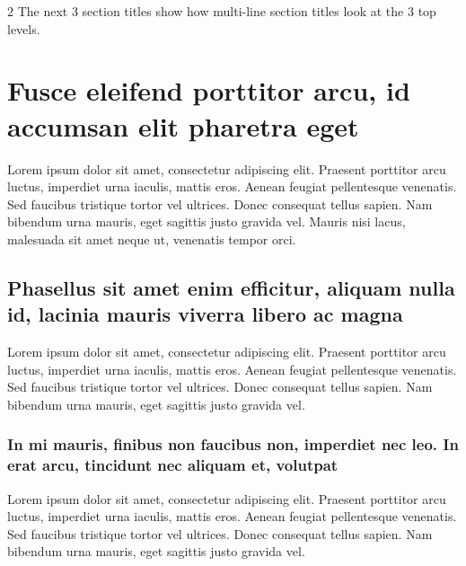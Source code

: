 \documentclass[
	a4paper, %
]{CSMakotoTechnicalReport}
\begin{document}
\begin{multicols}{2}
The next 3 section titles show how multi-line section titles look at the 3 top levels.

\section[Short version of long section title]{Fusce eleifend porttitor arcu, id accumsan elit pharetra eget} %

Lorem ipsum dolor sit amet, consectetur adipiscing elit. Praesent porttitor arcu luctus, imperdiet urna iaculis, mattis eros. Aenean feugiat pellentesque venenatis. Sed faucibus tristique tortor vel ultrices. Donec consequat tellus sapien. Nam bibendum urna mauris, eget sagittis justo gravida vel. Mauris nisi lacus, malesuada sit amet neque ut, venenatis tempor orci.

\subsection{Phasellus sit amet enim efficitur, aliquam nulla id, lacinia mauris viverra libero ac magna}

Lorem ipsum dolor sit amet, consectetur adipiscing elit. Praesent porttitor arcu luctus, imperdiet urna iaculis, mattis eros. Aenean feugiat pellentesque venenatis. Sed faucibus tristique tortor vel ultrices. Donec consequat tellus sapien. Nam bibendum urna mauris, eget sagittis justo gravida vel.

\subsubsection{In mi mauris, finibus non faucibus non, imperdiet nec leo. In erat arcu, tincidunt nec aliquam et, volutpat}

Lorem ipsum dolor sit amet, consectetur adipiscing elit. Praesent porttitor arcu luctus, imperdiet urna iaculis, mattis eros. Aenean feugiat pellentesque venenatis. Sed faucibus tristique tortor vel ultrices. Donec consequat tellus sapien. Nam bibendum urna mauris, eget sagittis justo gravida vel.



\end{multicols}
\end{document}
